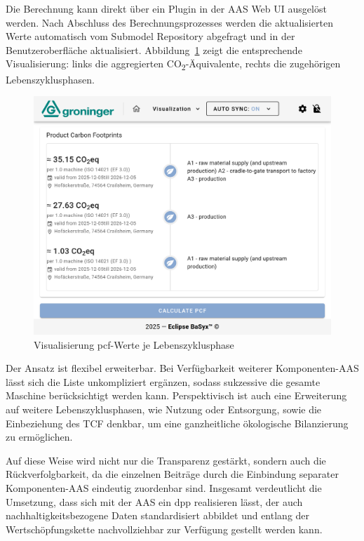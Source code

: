 Die Berechnung kann direkt über ein Plugin in der AAS Web UI ausgelöst werden.
Nach Abschluss des Berechnungsprozesses werden die aktualisierten Werte automatisch vom Submodel Repository abgefragt und in der Benutzeroberfläche aktualisiert.
Abbildung~\ref{fig:PluginAggregation} zeigt die entsprechende Visualisierung: links die aggregierten CO\textsubscript{2}-Äquivalente, rechts die zugehörigen Lebenszyklusphasen.

\begin{figure}[htbp]
    \centering
        \includegraphics[width=1\textwidth]{Bilder/ErgebnisseAASWebUI/CarbonFootprint.png}
    \caption{Visualisierung \acs{pcf}-Werte je Lebenszyklusphase}
    \label{fig:PluginAggregation}
\end{figure}
\vspace{-0.5em}

Der Ansatz ist flexibel erweiterbar.
Bei Verfügbarkeit weiterer Komponenten-AAS lässt sich die Liste unkompliziert ergänzen, sodass sukzessive die gesamte Maschine berücksichtigt werden kann. 
Perspektivisch ist auch eine Erweiterung auf weitere Lebenszyklusphasen, wie Nutzung oder Entsorgung, sowie die Einbeziehung des TCF denkbar, um eine ganzheitliche ökologische Bilanzierung zu ermöglichen.

Auf diese Weise wird nicht nur die Transparenz gestärkt, sondern auch die Rückverfolgbarkeit, da die einzelnen Beiträge durch die Einbindung separater Komponenten-AAS eindeutig zuordenbar sind. 
Insgesamt verdeutlicht die Umsetzung, dass sich mit der AAS ein \acs{dpp} realisieren lässt, der auch nachhaltigkeitsbezogene Daten standardisiert abbildet und entlang der Wertschöpfungskette nachvollziehbar zur Verfügung gestellt werden kann.


